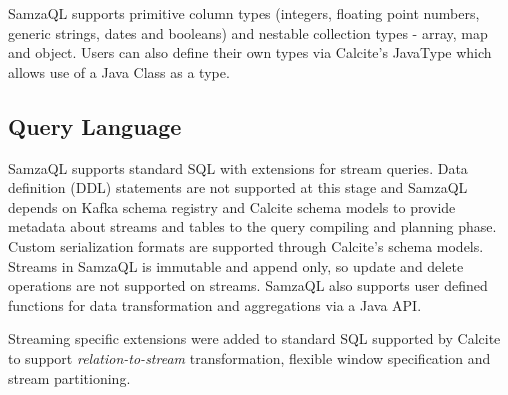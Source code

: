 \documentclass[10pt, conference, compsocconf]{IEEEtran}
\begin{document}
SamzaQL supports primitive column types (integers, floating
point numbers, generic strings, dates and booleans) and
nestable collection types - array, map and object. Users can also define their own types via Calcite's JavaType which allows use of a Java Class as a type.

\subsection{Query Language}
SamzaQL supports standard SQL with extensions for stream queries. Data definition (DDL) statements are not supported at this stage and SamzaQL depends on Kafka schema registry and Calcite schema models to provide metadata about streams and tables to the query compiling and planning phase. Custom serialization formats are supported through Calcite's schema models.
Streams in SamzaQL is immutable and append only, so update and delete operations are not supported on streams. SamzaQL also supports user defined functions for data transformation and aggregations via a Java API.

Streaming specific extensions were added to standard SQL supported by Calcite to support \textit{relation-to-stream} transformation, flexible window specification and stream partitioning.
\end{document}
